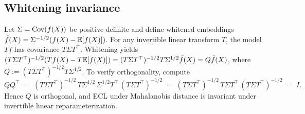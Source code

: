 \subsection{Whitening invariance}

Let $\Sigma=\operatorname{Cov}(f(X))$ be positive definite and define whitened embeddings $\tilde f(X)=\Sigma^{-1/2}(f(X)-\mathbb{E}[f(X)])$. For any invertible linear transform $T$, the model $Tf$ has covariance $T\Sigma T^\top$. Whitening yields $(T\Sigma T^\top)^{-1/2}(Tf(X) - T\mathbb{E}[f(X)]) = (T\Sigma T^\top)^{-1/2}T\Sigma^{1/2}\tilde{f}(X) = Q\tilde f(X)$, where $Q := (T\Sigma T^\top)^{-1/2}T\Sigma^{1/2}$. To verify orthogonality, compute
\[
QQ^\top \;=\; (T\Sigma T^\top)^{-1/2}\,T\Sigma^{1/2}\,\Sigma^{1/2}T^\top\,(T\Sigma T^\top)^{-1/2}
\;=\; (T\Sigma T^\top)^{-1/2}\,T\Sigma T^\top\,(T\Sigma T^\top)^{-1/2}
\;=\; I.
\]
Hence $Q$ is orthogonal, and ECL under Mahalanobis distance is invariant under invertible linear reparameterization.
